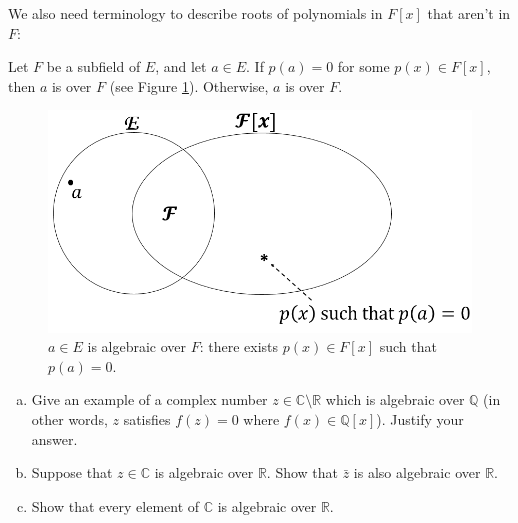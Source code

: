 
We also need terminology to describe roots of polynomials in $F[x]$ that aren't in $F$:

\begin{defn}\label{def:algover}  
Let $F$ be a subfield of $E$, and let $a\in E$. If $p(a)=0$ for some $p(x) \in F[x]$, then $a$ is  over $F$ (see Figure \ref{algebraicelement}). Otherwise, $a$  is  over $F$.
\end{defn}

\begin{figure}
\begin{center}
\includegraphics[scale=0.35]{images/algebraic_element.png}
\caption{$a\in E$ is algebraic over $F$:  there exists $p(x)\in F[x]$ such that $p(a)=0$.}\label{algebraicelement}
\end{center}
\end{figure}

\begin{exercise}{}
\begin {enumerate}[(a)]
\item
Give an example of a complex number $z \in \mathbb{C}\setminus \mathbb{R}$ which is algebraic over $\mathbb{Q}$ (in other words, $z$ satisfies $f(z)=0$ where $f(x) \in \mathbb Q[x]$). Justify your answer.
\item
Suppose that $z \in \mathbb{C}$ is algebraic over $\mathbb{R}$. Show that $\bar{z}$ is also algebraic over $\mathbb{R}$.
\item
Show that every element of $\mathbb{C}$ is algebraic over $\mathbb{R}$.
\end{enumerate}
\end{exercise}


